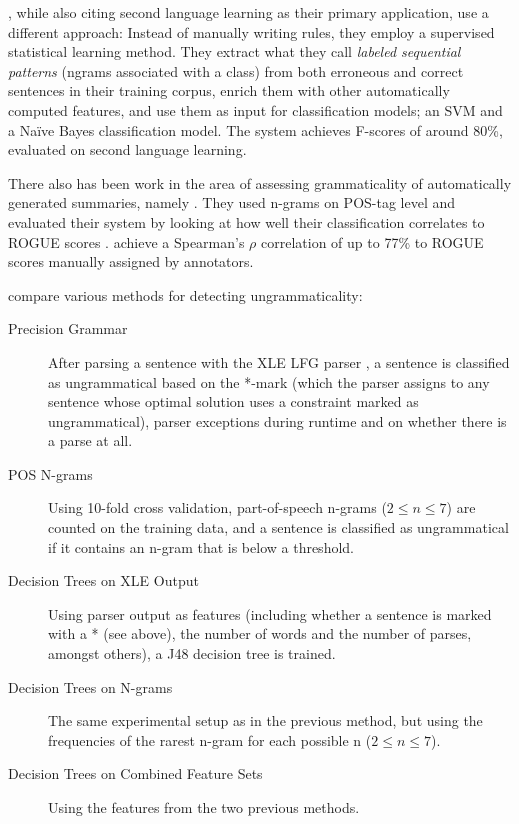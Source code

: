 \documentclass[a4paper,10pt]{scrartcl}
\theoremstyle{style}
\begin{document}
\cite{sun2007detecting}, while also citing second language learning as their primary application, use a different approach: Instead of manually writing rules, they employ a supervised statistical learning method. They extract what they call \textit{labeled sequential patterns} (ngrams associated with a class) from both erroneous and correct sentences in their training corpus, enrich them with other automatically computed features, and use them as input for classification models; an SVM \citep[SVMlight,][]{Joachims/02a} and a Na\"ive Bayes classification model. The system achieves F-scores of around 80\%, evaluated on second language learning.

There also has been work in the area of assessing grammaticality of automatically generated summaries, namely \cite{vadlapudi2010automated}. They used n-grams on POS-tag level and evaluated their system by looking at how well their classification correlates to ROGUE scores \citep{lin2004rouge}. \citeauthor{vadlapudi2010automated} achieve a Spearman's $\rho{}$ correlation of up to 77\% to ROGUE scores manually assigned by annotators.

\cite{wagner2007comparative} compare various methods for detecting ungrammaticality:

\begin{description}
	\item[Precision Grammar] After parsing a sentence with the XLE LFG parser \citep{maxwell1996efficient}, a sentence is classified as ungrammatical based on the *-mark (which the parser assigns to any sentence whose optimal solution uses a constraint marked as ungrammatical), parser exceptions during runtime and on whether there is a parse at all.
	\item[POS N-grams] Using 10-fold cross validation, part-of-speech n-grams ($2 \leq n \leq 7$) are counted on the training data, and a sentence is classified as ungrammatical if it contains an n-gram that is below a threshold.
	\item[Decision Trees on XLE Output] Using parser output as features (including whether a sentence is marked with a * (see above), the number of words and the number of parses, amongst others), a J48 decision tree is trained.
	\item[Decision Trees on N-grams] The same experimental setup as in the previous method, but using the frequencies of the rarest n-gram for each possible n ($2 \leq n \leq 7$).
	\item[Decision Trees on Combined Feature Sets] Using the features from the two previous methods.
\end{description}
\end{document}
